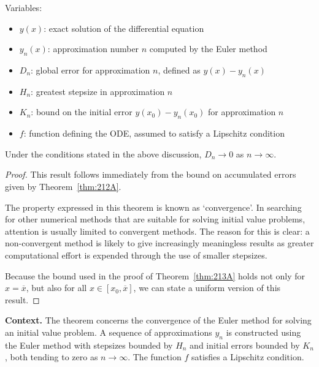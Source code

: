 Variables:
\begin{itemize}
    \item \(y(x)\): exact solution of the differential equation
    \item \(y_n(x)\): approximation number \(n\) computed by the Euler method
    \item \(D_n\): global error for approximation \(n\), defined as \(y(x) - y_n(x)\)
    \item \(H_n\): greatest stepsize in approximation \(n\)
    \item \(K_n\): bound on the initial error \(y(x_0) - y_n(x_0)\) for approximation \(n\)
    \item \(f\): function defining the ODE, assumed to satisfy a Lipschitz condition
\end{itemize}

\begin{theorem}

  \label{thm:213A}
Under the conditions stated in the above discussion, $D_n \to 0$ as $n \to \infty$.
\end{theorem}

\begin{proof}
This result follows immediately from the bound on accumulated errors given by Theorem~\ref{thm:212A}.

The property expressed in this theorem is known as `convergence'. In searching for other numerical methods that are suitable for solving initial value problems, attention is usually limited to convergent methods. The reason for this is clear: a non-convergent method is likely to give increasingly meaningless results as greater computational effort is expended through the use of smaller stepsizes.

Because the bound used in the proof of Theorem~\ref{thm:213A} holds not only for $x = \overline{x}$, but also for all $x \in [x_0, \overline{x}]$, we can state a uniform version of this result.
\end{proof}

\noindent\textbf{Context.}
The theorem concerns the convergence of the Euler method for solving an initial value problem. A sequence of approximations \(y_n\) is constructed using the Euler method with stepsizes bounded by \(H_n\) and initial errors bounded by \(K_n\), both tending to zero as \(n \to \infty\). The function \(f\) satisfies a Lipschitz condition.

